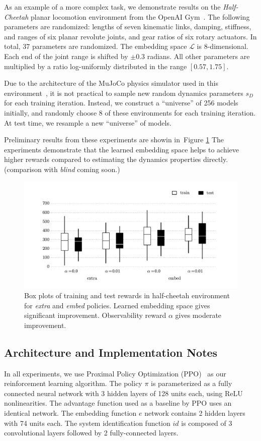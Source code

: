 \documentclass{article}
\newcommand{\cL}{\mathcal{L}}
\newcommand{\blind}{\emph{blind}}
\newcommand{\extra}{\emph{extra}}
\newcommand{\embed}{\emph{embed}}
\newcommand{\embedfn}{e}
\newcommand{\idfn}{id}
\newcommand{\figref}[1]{Figure \ref{#1}}
\begin{document}
As an example of a more complex task, we demonstrate results on the \emph{Half-Cheetah}
planar locomotion environment from the OpenAI Gym~\citep{openai-gym}.
The following parameters are randomized:
lengths of seven kinematic links,
damping, stiffness, and ranges of six planar revolute joints,
and gear ratios of six rotary actuators.
In total, 37 parameters are randomized.
The embedding space $\cL$ is 8-dimensional.
Each end of the joint range is shifted by $\pm 0.3$ radians.
All other parameters are multiplied by a ratio log-uniformly distributed in the range $[0.57, 1.75]$.

Due to the architecture of the MuJoCo physics simulator used in this environment~\citep{todorov-mujoco},
it is not practical to sample new random dynamics parameters $s_D$ for each training iteration.
Instead, we construct a ``universe'' of 256 models initially, and randomly choose 8 of these environments for each training iteration.
At test time, we resample a new ``universe'' of models.

Preliminary results from these experiments are showin in~\figref{cheetah-boxplot}
The experiments demonstrate that the learned embedding space helps to achieve higher rewards
compared to estimating the dynamics properties directly.
(comparison with \blind{} coming soon.)

\begin{figure}[h]
\centering
\includegraphics[width=\textwidth]{halfcheetah_rewards.pdf}
\caption{
Box plots of training and test rewards in half-cheetah environment for \extra{} and \embed{} policies.
Learned embedding space gives significant improvement.
Observability reward $\alpha$ gives moderate improvement.
}
\label{cheetah-boxplot}
\end{figure}


\subsection{Architecture and Implementation Notes}
\label{implementation}
In all experiments, we use Proximal Policy Optimization (PPO)~\citep{schulman-ppo} as our reinforcement learning algorithm.
The policy $\pi$ is parameterized as a fully connected neural network with 3 hidden layers of 128 units each, using ReLU nonlinearities.
The advantage function used as a baseline by PPO uses an identical network.
The embedding function $\embedfn$ network contains 2 hidden layers with 74 units each.
The system identification function $\idfn$ is composed of 3 convolutional layers followed by 2 fully-connected layers.
\end{document}
